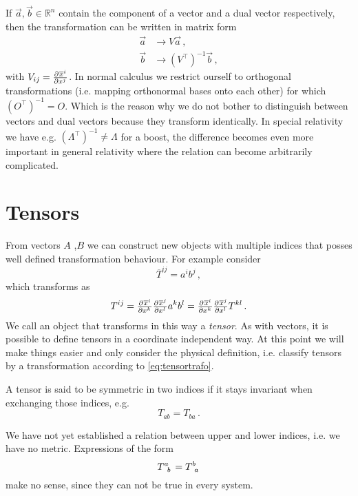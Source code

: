 \begin{remark}
If $\vec{a},\vec{b}\in\mathbb{R}^n$ contain the component of a vector and a dual vector respectively, 
then the transformation can be written in matrix form
\begin{align}
    \vec{a}&\to V\vec{a}\, ,\\
    \vec{b}&\to\left(V^\intercal\right)^{-1}\vec{b}\, ,
\end{align}
with $V_{ij}=\pd{\overline{x}^i}{{x^j}}$. 
In normal calculus we restrict ourself to orthogonal transformations (i.e.
mapping orthonormal bases onto each other) for which $(O^\intercal)^{-1}=O$.
Which is the reason why we do not bother to distinguish between vectors and dual vectors because they transform identically. 
In special relativity we have e.g. $(\Lambda^\intercal)^{-1}\neq\Lambda$ for a
boost, the difference becomes even more important in general relativity where the relation can become arbitrarily complicated.
\end{remark}
\section{Tensors}
From vectors $A$ ,$B$ we can construct new objects with multiple indices that posses well defined transformation behaviour. 
For example consider
\begin{equation}
    \overline{T}^{ij}=a^ib^j\, ,
\end{equation}
which transforms as
\begin{equation}
    T^{ij}=\pd{\overline{x}^i}{{x^k}}\pd{\overline{x}^j}{{x^l}}a^kb^l=\pd{\overline{x}^i}{{x^k}}\pd{\overline{x}^j}{{x^l}}T^{kl}\,
   .\label{eq:tensortrafo}
\end{equation}
We call an object that transforms in this way a \emph{tensor}. 
As with vectors, it is possible to define tensors in a coordinate independent
way.
At this point we will make things easier and only consider the physical
definition, i.e. classify tensors by a transformation according to \eqref{eq:tensortrafo}.

A tensor is said to be symmetric in two indices if it stays invariant when exchanging those indices, e.g.
\begin{equation}
    T_{ab}=T_{ba}\, .
\end{equation}
\begin{remark}
We have not yet established a relation between upper and lower indices, i.e. we have no metric. Expressions of the form
\begin{equation}
    \tensor{T}{^a_b}=\tensor{T}{^b_a}
\end{equation}
make no sense, since they can not be true in every system.
\end{remark}
